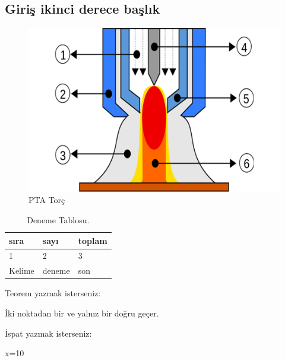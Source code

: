 \subsection{Giriş ikinci derece başlık}
\lipsum[1-2]
\begin{figure}[h]
\centering
\includegraphics[width=\textwidth]{gorseller/ptaTorc}
\caption{PTA Torç}\label{fig:PtaTorc1}
\end{figure}
\lipsum[1-2]
\begin{table}
\centering
\caption{Deneme Tablosu.}\label{tab:den1}
\begin{tabular}{|l|l|l|}
\hline
sıra   & sayı   & toplam \\ \hline
1      & 2      & 3      \\ \hline
Kelime & deneme & son    \\ \hline
\end{tabular}
\end{table}

Teorem yazmak isterseniz:
\begin{theorem}[Öklid]
 İki noktadan bir ve yalnız bir doğru geçer.
\end{theorem}

İspat yazmak isterseniz:
\begin{ispat}
x=10
\end{ispat}

